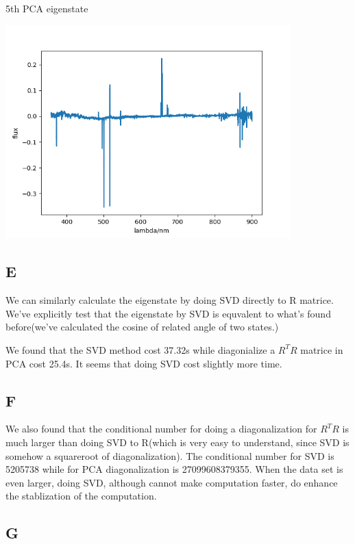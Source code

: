 \documentclass[letterpaper,12pt]{article}
\begin{document}
\begin{table}[!h]
    \centering
    \caption{5th PCA eigenstate}
    \includegraphics[width=11cm]{7-4-4.png}
\end{table}%
\newpage

\subsection{E}

We can similarly calculate the eigenstate by doing SVD directly to R matrice. We've explicitly test that the eigenstate by SVD is equvalent to what's found before(we've calculated the cosine of related angle of two states.)

We found that the SVD method cost 37.32s while diagonialize a $R^TR$ matrice in PCA cost 25.4s. It seems that doing SVD cost slightly more time.

\subsection{F}

We also found that the conditional number for doing a diagonalization for $R^TR$ is much larger than doing SVD to R(which is very easy to understand, since SVD is somehow a squareroot of diagonalization). The conditional number for SVD is 5205738 while for PCA diagonalization is 27099608379355. When the data set is even larger, doing SVD, although cannot make computation faster, do enhance the stablization of the computation.

\subsection{G}
\end{document}
